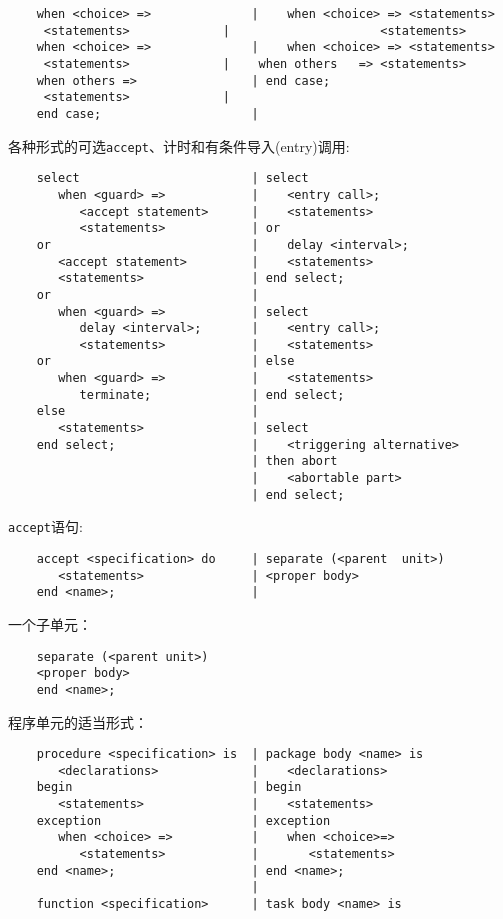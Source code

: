 \begin{blockindent}
\begin{lstlisting}
    when <choice> =>              |    when <choice> => <statements>
	 <statements>             |                     <statements>
    when <choice> =>              |    when <choice> => <statements>
	 <statements>             |    when others   => <statements>
    when others =>                | end case;
	 <statements>             |
    end case;                     |
\end{lstlisting}
各种形式的可选\texttt{accept}、计时和有条件导入(entry)调用:
\begin{lstlisting}
    select                        | select
       when <guard> =>            |    <entry call>;
          <accept statement>      |    <statements>
          <statements>            | or
    or                            |    delay <interval>;
       <accept statement>         |    <statements>
       <statements>               | end select;
    or                            |
       when <guard> =>            | select
          delay <interval>;       |    <entry call>;
          <statements>            |    <statements>
    or                            | else
       when <guard> =>            |    <statements>
          terminate;              | end select;
    else                          |
       <statements>               | select
    end select;                   |    <triggering alternative>
                                  | then abort
                                  |    <abortable part>
                                  | end select;
\end{lstlisting}
\texttt{accept}语句:
\begin{lstlisting}
    accept <specification> do     | separate (<parent  unit>)
       <statements>               | <proper body>
    end <name>;                   |
\end{lstlisting}
一个子单元：
\begin{lstlisting}
    separate (<parent unit>)
    <proper body>
    end <name>;
\end{lstlisting}
程序单元的适当形式：
\begin{lstlisting}
    procedure <specification> is  | package body <name> is
       <declarations>             |    <declarations>
    begin                         | begin
       <statements>               |    <statements>
    exception                     | exception
       when <choice> =>           |    when <choice>=>
          <statements>            |       <statements>
    end <name>;                   | end <name>;
                                  |
    function <specification>      | task body <name> is

\end{lstlisting}
\end{blockindent}
